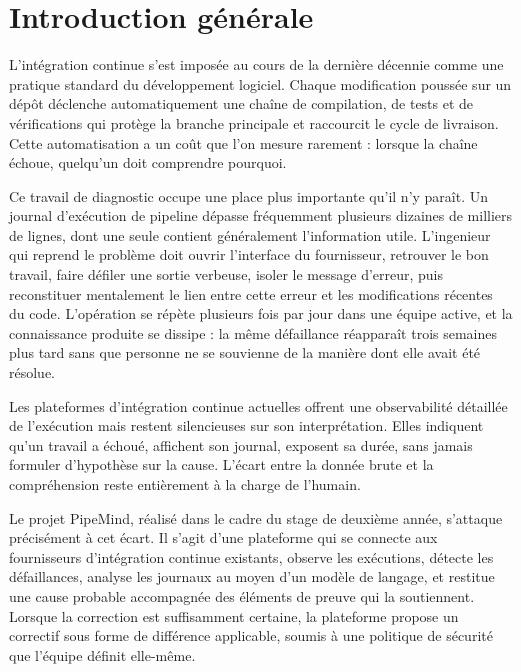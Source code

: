 \documentclass[12pt,a4paper,oneside]{report}
\begin{document}
\clearpage
\chapter*{Introduction générale}

L'intégration continue s'est imposée au cours de la dernière décennie comme une
pratique standard du développement logiciel. Chaque modification poussée sur un
dépôt déclenche automatiquement une chaîne de compilation, de tests et de
vérifications qui protège la branche principale et raccourcit le cycle de
livraison. Cette automatisation a un coût que l'on mesure rarement : lorsque la
chaîne échoue, quelqu'un doit comprendre pourquoi.

Ce travail de diagnostic occupe une place plus importante qu'il n'y paraît. Un
journal d'exécution de pipeline dépasse fréquemment plusieurs dizaines de
milliers de lignes, dont une seule contient généralement l'information utile.
L'ingenieur qui reprend le problème doit ouvrir l'interface du fournisseur,
retrouver le bon travail, faire défiler une sortie verbeuse, isoler le message
d'erreur, puis reconstituer mentalement le lien entre cette erreur et les
modifications récentes du code. L'opération se répète plusieurs fois par jour
dans une équipe active, et la connaissance produite se dissipe : la même
défaillance réapparaît trois semaines plus tard sans que personne ne se souvienne
de la manière dont elle avait été résolue.

Les plateformes d'intégration continue actuelles offrent une observabilité
détaillée de l'exécution mais restent silencieuses sur son interprétation. Elles
indiquent qu'un travail a échoué, affichent son journal, exposent sa durée, sans
jamais formuler d'hypothèse sur la cause. L'écart entre la donnée brute et la
compréhension reste entièrement à la charge de l'humain.

Le projet PipeMind, réalisé dans le cadre du stage de deuxième année, s'attaque
précisément à cet écart. Il s'agit d'une plateforme qui se connecte aux
fournisseurs d'intégration continue existants, observe les exécutions, détecte
les défaillances, analyse les journaux au moyen d'un modèle de langage, et
restitue une cause probable accompagnée des éléments de preuve qui la soutiennent.
Lorsque la correction est suffisamment certaine, la plateforme propose un
correctif sous forme de différence applicable, soumis à une politique de sécurité
que l'équipe définit elle-même.
\end{document}
